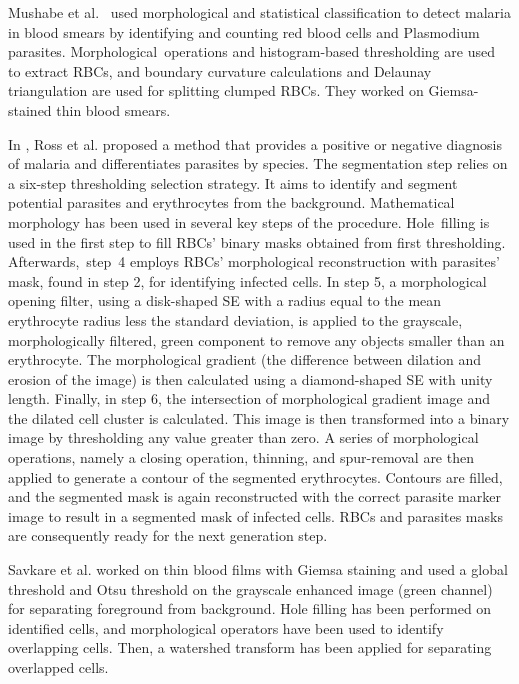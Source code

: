 \documentclass[final,a4paper,12pt,english]{UnicaPhdThesis3}
\begin{document}
Mushabe et al.~\cite{Mushabe2013} used morphological and statistical classification to detect malaria in blood smears by identifying and counting red blood cells and Plasmodium parasites. Morphological~operations and histogram-based thresholding are used to extract RBCs, and boundary curvature calculations and Delaunay triangulation are used for splitting clumped RBCs. They worked on Giemsa-stained thin blood smears.

In \cite{Ross2006}, Ross et al. proposed a method that provides a positive or negative diagnosis of malaria and differentiates parasites by species. The segmentation step relies on a six-step thresholding selection strategy. It aims to identify and segment potential parasites and erythrocytes from the background. Mathematical morphology has been used in several key steps of the procedure. Hole~filling is used in the first step to fill RBCs' binary masks obtained from first thresholding. \mbox{Afterwards, step 4} employs RBCs' morphological reconstruction with parasites' mask, found in step 2, for identifying infected cells. In step 5, a morphological opening filter, using a disk-shaped SE with a radius equal to the mean erythrocyte radius less the standard deviation, is applied to the grayscale, morphologically filtered, green component to remove any objects smaller than an erythrocyte. The morphological gradient (the difference between dilation and erosion of the image) is then calculated using a diamond-shaped SE with unity length.
Finally, in step 6, the intersection of morphological gradient image and the dilated cell cluster is calculated. This image is then transformed into a binary image by thresholding any value greater than zero. A series of morphological operations, namely a closing operation, thinning, and spur-removal are then applied to generate a contour of the segmented erythrocytes. Contours are filled, and the segmented mask is again reconstructed with the correct parasite marker image to result in a segmented mask of infected cells. RBCs and parasites masks are consequently ready for the next generation step.

Savkare et al. \cite{Savkare2011b} worked on thin blood films with Giemsa staining and used a global threshold and Otsu threshold \cite{Otsu} on the grayscale enhanced image (green channel) for separating foreground from background. Hole filling has been performed on identified cells, and morphological operators have been used to identify overlapping cells. Then, a watershed transform has been applied for separating overlapped cells.
\end{document}
